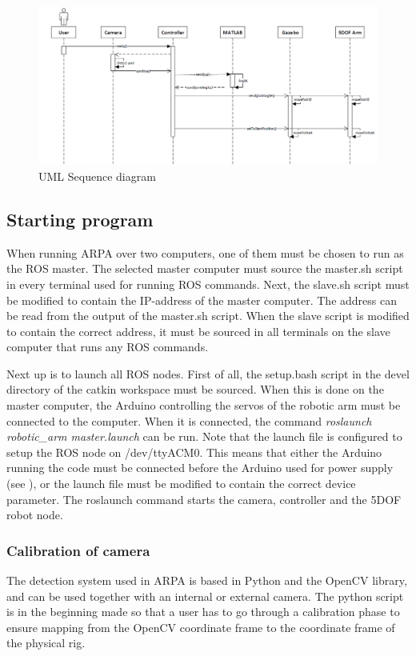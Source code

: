 \documentclass[11pt,a4paper, titlepage]{report}
\begin{document}
	
	\begin{figure}[H]
		\includegraphics[width=\linewidth]{../Diagrams/SequenceDiagram-v1.png}
		\caption{UML Sequence diagram}
		\label{fig:seq-diagram}
	\end{figure}
	
	\subsection{Starting program}
	\label{startup}
	
	When running ARPA over two computers, one of them must be chosen to run as the ROS master. The selected master computer must source the master.sh script in every terminal used for running ROS commands. Next, the slave.sh script must be modified to contain the IP-address of the master computer. The address can be read from the output of the master.sh script. When the slave script is modified to contain the correct address, it must be sourced in all terminals on the slave computer that runs any ROS commands.
	
	Next up is to launch all ROS nodes. First of all, the setup.bash script in the devel directory of the catkin workspace must be sourced. When this is done on the master computer, the Arduino controlling the servos of the robotic arm must be connected to the computer. When it is connected, the command \textit{roslaunch robotic\_arm master.launch} can be run. Note that the launch file is configured to setup the ROS node on /dev/ttyACM0. This means that either the Arduino running the code must be connected before the Arduino used for power supply (see ), or the launch file must be modified to contain the correct device parameter. The roslaunch command starts the camera, controller and the 5DOF robot node. 
	
\subsubsection{Calibration of camera}
The detection system used in ARPA is based in Python and the OpenCV library, and can be used together with an internal or external camera. The python script is in the beginning made so that a user has to go through a calibration phase to ensure mapping from the OpenCV coordinate frame to the coordinate frame of the physical rig.
\end{document}
